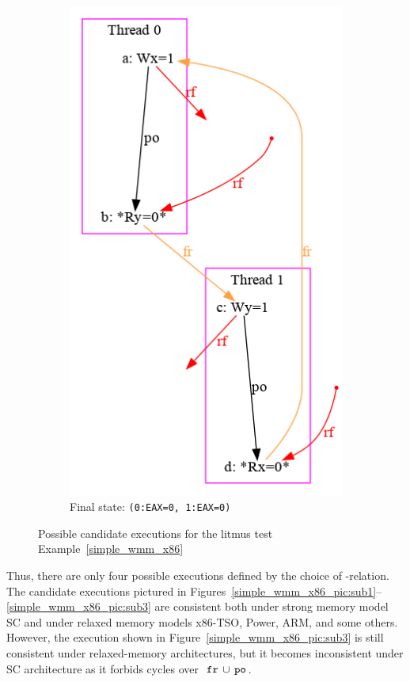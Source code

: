 \begin{figure}[!htb]
\begin{subfigure}[t]{.23\textwidth}
  \includegraphics[width=.9\linewidth]{img/my/sb-example/SB-dot-4.png}
  \caption{Final state: \texttt{(0:EAX=0,~1:EAX=0)}}
  \label{simple_wmm_x86_pic:sub4}
\end{subfigure}
\hfill
\caption{Possible candidate executions for the litmus test Example~\ref{simple_wmm_x86}}
\label{simple_wmm_x86_pic}
\end{figure}

Thus, there are only four possible executions defined by the choice of \rf-relation.
The candidate executions pictured in Figures~\ref{simple_wmm_x86_pic:sub1}--\ref{simple_wmm_x86_pic:sub3} are consistent both under strong memory model SC and under relaxed memory models x86-TSO, Power, ARM, and some others.
However, the execution shown in Figure~\ref{simple_wmm_x86_pic:sub3} is still consistent under relaxed-memory architectures, but it becomes inconsistent under SC architecture as it forbids cycles over~$\,\mathtt{fr}\,\cup\,\mathtt{po}\,$.


